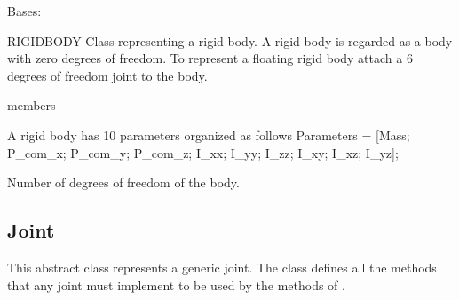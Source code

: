 \documentclass[letterpaper,10pt,english]{sphinxmanual}
\begin{document}
\begin{fulllineitems}
\label{\detokenize{rigidbody:RigidBody}}
\pysigstartsignatures
{}
\pysigstopsignatures
\sphinxAtStartPar
Bases: {\hyperref[\detokenize{body:Body}]{}}

\sphinxAtStartPar
RIGIDBODY Class representing a rigid body. A rigid body is regarded as
a body with zero degrees of freedom. To represent a floating rigid
body attach a 6 degrees of freedom joint to the body.

\begin{sphinxuseclass}{members}\begin{description}

\begin{fulllineitems}
\label{\detokenize{rigidbody:RigidBody.Parameters}}
\pysigstartsignatures
{}
\pysigstopsignatures
\sphinxAtStartPar
A rigid body has 10 parameters organized as follows
Parameters = {[}Mass; P\_com\_x; P\_com\_y; P\_com\_z; I\_xx; I\_yy; I\_zz; I\_xy; I\_xz; I\_yz{]};

\end{fulllineitems}


\begin{fulllineitems}
\label{\detokenize{rigidbody:RigidBody.n}}
\pysigstartsignatures
{}
\pysigstopsignatures
\sphinxAtStartPar
Number of degrees of freedom of the body.

\end{fulllineitems}


\end{description}

\end{sphinxuseclass}
\end{fulllineitems}


\sphinxstepscope


\subsection{Joint}
\label{\detokenize{joint:joint}}\label{\detokenize{joint::doc}}\label{\detokenize{joint:module-classes}}
\sphinxAtStartPar
This abstract class represents a generic joint. The class defines all the methods that any joint must implement to be used by the methods of {\hyperref[\detokenize{bodytree:BodyTree}]{}}.
\end{document}
